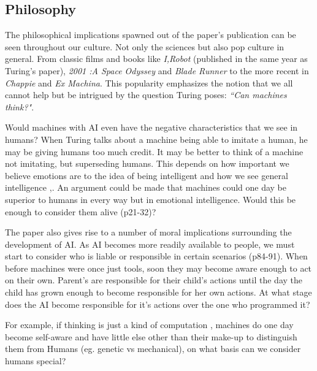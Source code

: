 \documentclass{scrartcl}
\begin{document}
\subsection{Philosophy}

The philosophical implications spawned out of the paper's publication can be seen throughout our culture. Not only the sciences but also pop culture in general. From classic films and books like \textit{I,Robot} (published in the same year as Turing's paper), \textit{2001 :A Space Odyssey} and \textit{Blade Runner} to the more recent in \textit{Chappie} and \textit{Ex Machina}. This popularity emphasizes the notion that we all cannot help but be intrigued by the question Turing poses: \textit{\textquotedblleft Can machines think?"}. 

Would machines with AI even have the negative characteristics that we see in humans? When Turing talks about a machine being able to imitate a human, he may be giving humans too much credit. It may be better to think of a machine not imitating, but superseding humans. This depends on how important we believe emotions are to the idea of being intelligent and how we see general intelligence \cite{mccarthy1969some:14},\cite{brooks1999cambrian:15}. An argument could be made that machines could one day be superior to humans in every way but in emotional intelligence. Would this be enough to consider them alive \cite{picard1997affective:16} (p21-32)? 

The paper also gives rise to a number of moral implications surrounding the development of AI. As AI becomes more readily available to people, we must start to consider who is liable or responsible in certain scenarios \cite{kaplan2015humans:17} (p84-91). When before machines were once just tools, soon they may become aware enough to act on their own. Parent's are responsible for their child's actions until the day the child has grown enough to become responsible for her own actions. At what stage does the AI become responsible for it's actions over the one who programmed it?

For example, if thinking is just a kind of computation \cite{pinker2003mind:18}, machines do one day become self-aware and have little else other than their make-up to distinguish them from Humans (eg. genetic vs mechanical), on what basis can we consider humans special?
\end{document}
